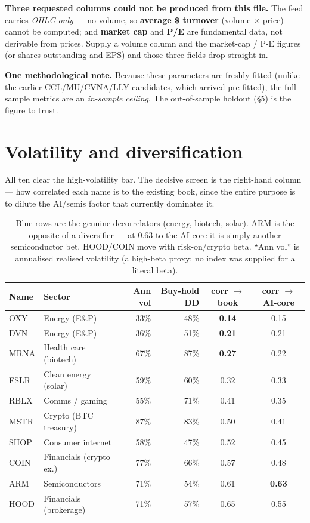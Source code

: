 \documentclass[11pt]{article}
\begin{document}
\textbf{Three requested columns could not be produced from this file.} The feed carries
\emph{OHLC only} --- no volume, so \textbf{average \$ turnover} (volume $\times$ price) cannot be
computed; and \textbf{market cap} and \textbf{P/E} are fundamental data, not derivable from
prices. Supply a volume column and the market-cap / P-E figures (or shares-outstanding and EPS)
and those three fields drop straight in.

\textbf{One methodological note.} Because these parameters are freshly fitted (unlike the earlier
CCL/MU/CVNA/LLY candidates, which arrived pre-fitted), the full-sample metrics are an
\emph{in-sample ceiling}. The out-of-sample holdout (\S5) is the figure to trust.

\section{Volatility and diversification}

All ten clear the high-volatility bar. The decisive screen is the right-hand column --- how
correlated each name is to the existing book, since the entire purpose is to dilute the AI/semis
factor that currently dominates it.

\begin{table}[H]\centering\small
\renewcommand{\arraystretch}{1.15}
\begin{tabular}{l l r r c c}
\toprule
\textbf{Name} & \textbf{Sector} & \textbf{Ann vol} & \textbf{Buy-hold DD} & \textbf{corr $\to$ book} & \textbf{corr $\to$ AI-core}\\
\midrule
\rowcolor{bckeep} OXY  & Energy (E\&P)          & 33\% & 48\% & \textbf{0.14} & 0.15\\
\rowcolor{bckeep} DVN  & Energy (E\&P)          & 36\% & 51\% & \textbf{0.21} & 0.21\\
\rowcolor{bckeep} MRNA & Health care (biotech)  & 67\% & 87\% & \textbf{0.27} & 0.22\\
\rowcolor{bckeep} FSLR & Clean energy (solar)   & 59\% & 60\% & 0.32 & 0.33\\
RBLX & Comms / gaming         & 55\% & 71\% & 0.41 & 0.35\\
MSTR & Crypto (BTC treasury)  & 87\% & 83\% & 0.50 & 0.41\\
SHOP & Consumer internet      & 58\% & 47\% & 0.52 & 0.45\\
COIN & Financials (crypto ex.)& 77\% & 66\% & 0.57 & 0.48\\
ARM  & Semiconductors         & 71\% & 54\% & 0.61 & \textbf{0.63}\\
HOOD & Financials (brokerage) & 71\% & 57\% & 0.65 & 0.55\\
\bottomrule
\end{tabular}
\caption*{\footnotesize Blue rows are the genuine decorrelators (energy, biotech, solar). ARM is
the opposite of a diversifier --- at 0.63 to the AI-core it is simply another semiconductor bet.
HOOD/COIN move with risk-on/crypto beta. ``Ann vol'' is annualised realised volatility (a
high-beta proxy; no index was supplied for a literal beta).}
\end{table}
\end{document}
